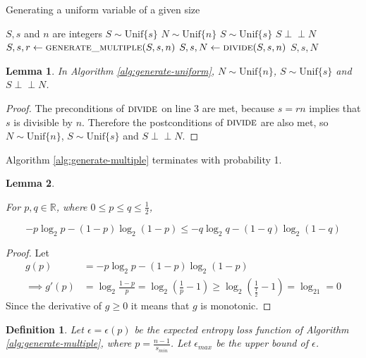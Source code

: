 \documentclass[12pt]{article}
\newtheorem{lemma}{Lemma}
\newtheorem{definition}{Definition}
\newcommand{\indep}{\perp\!\!\!\perp}
\newcommand{\unif}[1]{\mathrm{Unif}\{#1\}}
\begin{document}
\begin{algorithm}
\caption{Generating a uniform variable of a given size}
\label{alg:generate-uniform}
\begin{algorithmic}[1]
\Require $S, s$ and $n$ are integers
\Require $S \sim \unif{s}$
\Ensure $N \sim \unif{n}$
\Ensure $S \sim \unif{s}$
\Ensure $S \indep N$
  \State $S, s, r \gets \textsc{generate\_multiple}(S, s, n)$
  \State $S, s, N \gets \textsc{divide}(S, s, n)$
  \State \Return $S, s, N$
\EndProcedure
\end{algorithmic}
\end{algorithm}

\begin{lemma}
    In Algorithm \ref{alg:generate-uniform}, $N \sim \unif{n}$, $S \sim \unif{s}$ and $S \indep N$.
\end{lemma}

\begin{proof}
    The preconditions of $\textsc{divide}$ on line 3 are met, because $s=rn$ implies that $s$ is divisible by $n$. Therefore the postconditions of $\textsc{divide}$ are also met, so $N \sim \unif{n}$, $S \sim \unif{s}$ and $S \indep N$.
\end{proof}

Algorithm \ref{alg:generate-multiple} terminates with probability 1.

\begin{lemma}
    \label{lem:shannon-inequality}

For $p,q \in \mathbb{R}$, where $0 \le p\le q \le \frac{1}{2}$, 

\begin{equation}
-p\log_2 p - (1-p)\log_2(1-p) \le -q\log_2 q - (1-q)\log_2(1-q)
\end{equation}
\end{lemma}

\begin{proof}
    Let
    \begin{align}
        g(p) & = -p\log_2 p - (1-p)\log_2(1-p) \\
        \implies g'(p) & = \log_2\frac{1-p}{p} = \log_2(\frac{1}{p}-1) \ge \log_2(\frac{1}{\frac{1}{2}}-1) = \log_21 = 0 
    \end{align}
Since the derivative of $g\ge 0$ it means that $g$ is monotonic.
\end{proof}

\begin{definition}
    Let $\epsilon = \epsilon(p)$ be the expected entropy loss function of Algorithm \ref{alg:generate-multiple}, where $p=\frac{n-1}{s_{min}}$. Let $\epsilon_{max}$ be the upper bound of $\epsilon$.
\end{definition}
\end{document}
